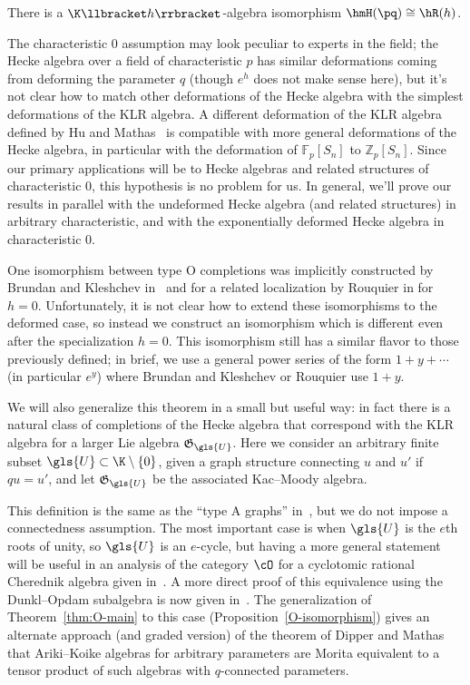 \begin{theorem} \label{thm:O-main}
 There is a $\K\llbracket h\rrbracket $-algebra isomorphism $\hmH(\pq)\cong \hR(h)$. 
\end{theorem}
The characteristic 0 assumption may look peculiar to experts in the
field; the Hecke algebra over a field of characteristic $p$ has
similar deformations coming from deforming the parameter $q$ (though
$e^h$ does not make sense here), but it's not clear how to match other
deformations of the Hecke algebra with the simplest deformations of
the KLR algebra. 
A different deformation of the KLR algebra defined by Hu and Mathas~\cite{HMsemi} is
compatible with more general deformations of the Hecke algebra, in particular with the
deformation of $\mathbb{F}_p[S_n]$ to $\mathbb{Z}_p[S_n]$. 
Since our primary applications will be to Hecke algebras and
related structures of characteristic 0, this hypothesis is no problem
for us. In general, we'll prove our results in parallel with the undeformed Hecke
algebra (and related structures) in arbitrary characteristic, and with
the exponentially deformed Hecke algebra in characteristic 0.

One isomorphism between type O completions was implicitly constructed by Brundan and
Kleshchev in~\cite{BKKL} and for a related localization by Rouquier in
\cite[\S~3.2.5]{Rou2KM} for $h=0$. Unfortunately, it is not clear how
to extend these isomorphisms to the deformed case, so instead we
construct an isomorphism which is different even after the
specialization $h=0$. This isomorphism still has a similar flavor to those previously
defined; in brief, we use a general power series of the form
$1+y+\cdots$ (in particular $e^y$) where Brundan and Kleshchev or
Rouquier use $1+y$. 

We will also generalize this theorem in a small
but useful way: in fact there is a natural class of completions of the Hecke
algebra that correspond with the KLR algebra for a larger Lie
algebra $\mathfrak{G}_{\gls{U}}$. Here we consider an arbitrary finite subset $\gls{U}\subset \K\setminus\{0\}$, given a graph
structure connecting $u$ and $u'$ if $qu=u'$, and let $\mathfrak{G}_{\gls{U}}$
be the associated Kac--Moody algebra. 

This definition is the same as
the ``type A graphs'' in~\cite[\S~3.2.5]{Rou2KM}, but we do not impose
a connectedness assumption. 
The most important case is when $\gls{U}$ is the $e$th roots of unity, so
$\gls{U}$ is an $e$-cycle, but having a more general statement will be
useful in an analysis of the category $\cO$ for a cyclotomic rational
Cherednik algebra given in~\cite{WebRou}. A more direct proof of this
equivalence using the Dunkl--Opdam subalgebra is now given in~\cite{Webalt}. The generalization of
Theorem~\ref{thm:O-main} to this case (Proposition~\ref{O-isomorphism}) gives an
alternate approach (and graded version) of the theorem of Dipper and
Mathas~\cite{DMmorita} that Ariki--Koike algebras for arbitrary parameters are Morita
equivalent to a tensor product of such algebras with $q$-connected parameters.

